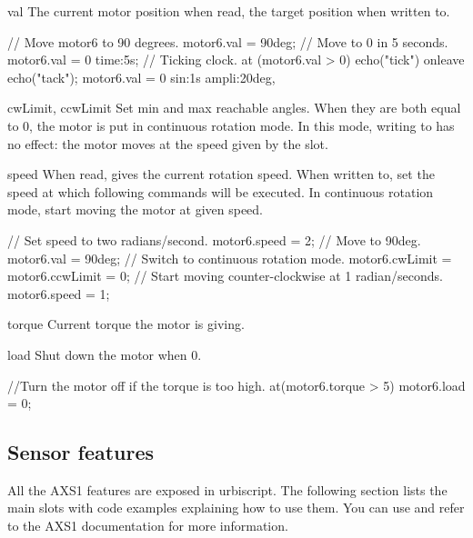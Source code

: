 \begin{urbiscriptapi}
\item[val] The current motor position when read, the target position when
  written to.

\begin{urbiunchecked}
// Move motor6 to 90 degrees.
motor6.val = 90deg;
// Move to 0 in 5 seconds.
motor6.val = 0 time:5s;
// Ticking clock.
at (motor6.val > 0) echo("tick") onleave echo("tack");
motor6.val = 0 sin:1s ampli:20deg,
\end{urbiunchecked}

\item[cwLimit, ccwLimit]%
  Set min and max reachable angles. When they are both equal to 0, the motor
  is put in continuous rotation mode. In this mode, writing to 
  has no effect: the motor moves at the speed given by the 
  slot.

\item[speed] When read, gives the current rotation speed. When written to,
  set the speed at which following commands will be executed. In continuous
  rotation mode, start moving the motor at given speed.
\begin{urbiunchecked}
// Set speed to two radians/second.
motor6.speed = 2;
// Move to 90deg.
motor6.val = 90deg;
// Switch to continuous rotation mode.
motor6.cwLimit = motor6.ccwLimit = 0;
// Start moving counter-clockwise at 1 radian/seconds.
motor6.speed = 1;
\end{urbiunchecked}

\item[torque]
  Current torque the motor is giving.

\item[load]
  Shut down the motor when 0.

\begin{urbiunchecked}
//Turn the motor off if the torque is too high.
at(motor6.torque > 5) motor6.load = 0;
\end{urbiunchecked}

\end{urbiscriptapi}

\subsection{Sensor features}
\def\currentObject{AXS1}

All the AXS1 features are exposed in urbiscript. The following section lists
the main slots with code examples explaining how to use them.  You can use
 and refer to the AXS1 documentation for
more information.

